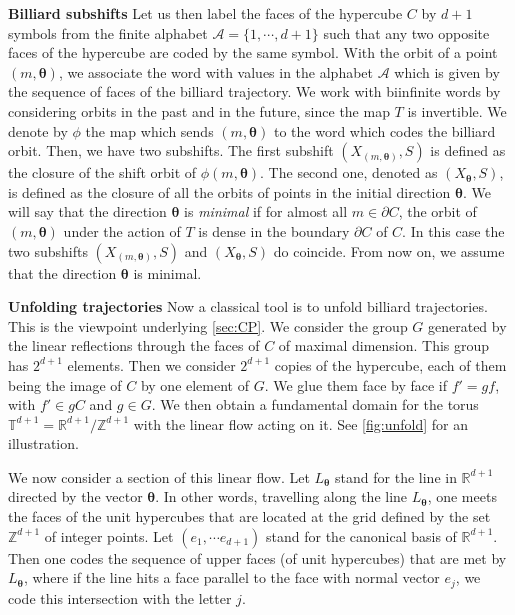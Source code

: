 \documentclass{article}
\theoremstyle{definition}
\newcommand{\R}{\mathbb{R}}
\newcommand{\btheta}{\boldsymbol{\theta}}
\begin{document}
\medskip

{\bf Billiard subshifts} Let us then label the faces of  the hypercube $C$ by $d + 1$  symbols from the finite alphabet ${\mathcal A}=\{1, \cdots, d+1\}$  such that any  two opposite faces of the hypercube are coded by the same symbol. With the orbit of a point $(m,\btheta)$, we associate the  word  with values in the alphabet ${\mathcal A}$ which is given by the sequence of faces of the billiard trajectory.  We  work with  biinfinite words  by considering  orbits in the past and in the future, since the  map  $T$ is invertible. We denote by $\phi$ the map which sends $(m,\btheta)$ to the  word which codes the billiard orbit.
Then, we have two subshifts.  The first  subshift  $(X_{(m,\btheta)},S)$ is defined as  the closure of the shift orbit of $\phi(m,\btheta)$. The second one,  denoted as $(X_{\btheta},S)$,
  is  defined as the closure of all the orbits of points in the initial direction $\btheta$. 
We will say that the direction $\btheta$ is {\em minimal} if for almost all 
$m\in\partial C$, the orbit of $(m,\btheta)$  under the action  of $T$ is dense in the boundary $\partial C$  of $C$. In this case the two subshifts   $(X_{(m,\btheta)},S)$ and  $(X_{\btheta},S)$ do coincide. From now on, we assume that  the direction $\btheta$ is minimal.



 


\medskip 
{\bf Unfolding trajectories}
Now a classical tool  is to  unfold  billiard trajectories.   This is the viewpoint underlying  \cref{sec:CP}.
We consider the group $G$ generated by the linear reflections through the faces of $C$ of maximal dimension. This group has
$2^{d+1}$ elements. Then we consider $2^{d+1}$ copies of the hypercube, 
 each of them being the  image of $C$ by one element of $G$. We glue them face by face if $f'=gf$, with  $f'\in gC$ and $ g\in G$. We  then obtain  a fundamental domain for the torus   $\mathbb T^{d+1}=\mathbb R^{d+1}/\mathbb Z^{d+1}$  with the linear   flow acting on it.  See \cref{fig:unfold} for an illustration. 
 
We now consider a section of this linear flow. Let $L_{\btheta}$ stand for the line in $\R^{d+1}$ directed by  the vector $\btheta$.  In other words, travelling along the  line $L_{\btheta}$,  one meets the faces of the unit hypercubes that are located at the grid defined by the set ${\mathbb Z}^{d+1}$ of integer points.  Let  $(e_1, \cdots e_{d+1})$ stand for the canonical basis of ${\mathbb R}^{d+1}$. Then  one codes the sequence of upper faces (of unit hypercubes) that are met by $L_{\btheta}$, where if the line hits a face parallel to the  face with normal vector $e_j$, we code this intersection with the letter $j$. 
\end{document}
